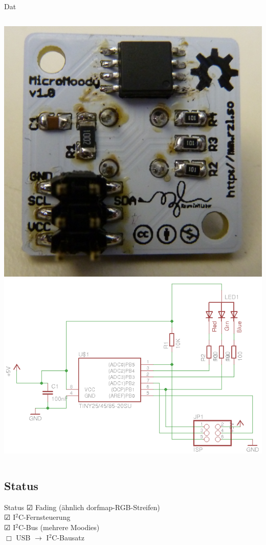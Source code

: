 \documentclass[compress]{beamer}
\begin{document}
\begin{frame}{Dat}
\begin{columns}
\includegraphics[width=\textwidth]{micromoody_back.jpg}
\includegraphics[width=\textwidth]{circuit.png}
\end{columns}
\end{frame}

\subsection{Status}
\begin{frame}{Status}
$\CheckedBox$ Fading (ähnlich dorfmap-RGB-Streifen)\\
$\CheckedBox$ I$^2$C-Fernsteuerung\\
$\CheckedBox$ I$^2$C-Bus (mehrere Moodies)\\
$\Box$ USB $\to$ I$^2$C-Bausatz
\end{frame}
\end{document}
